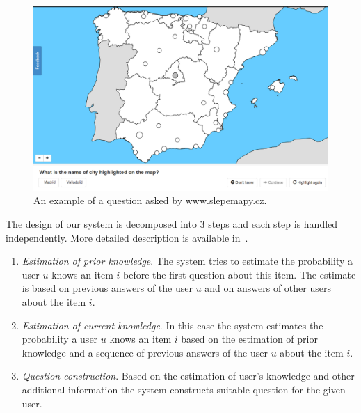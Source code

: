 \documentclass[table,color,cover,twoside,nolot,nolof]{fithesis3/fithesis3}
\begin{document}
\begin{figure}[h]
	\begin{center}
		\includegraphics[width=\textwidth]{figure/slepemapy_spain_highlighted}
		\caption{An example of a question asked by \url{www.slepemapy.cz}.}
		\label{figure:example_question}
	\end{center}
\end{figure}

The design of our system is decomposed into 3 steps and each step is handled
independently. More detailed description is available
in~\cite{papousek2014adaptive, papousek2015impact}.

\begin{enumerate}
	\item \emph{Estimation of prior knowledge}. The system tries to estimate the
		probability a user $u$ knows an item $i$ before the first question
		about this item. The estimate is based on previous answers of the user $u$
		and on answers of other users about the item $i$.
	\item \emph{Estimation of current knowledge}. In this case the system
		estimates the probability a user $u$ knows an item $i$ based on the
		estimation of prior knowledge and a sequence of previous answers of the
		user $u$ about the item $i$.
	\item \emph{Question construction}. Based on the estimation of user's
		knowledge and other additional information the system constructs suitable
		question for the given user.
\end{enumerate}
\end{document}
